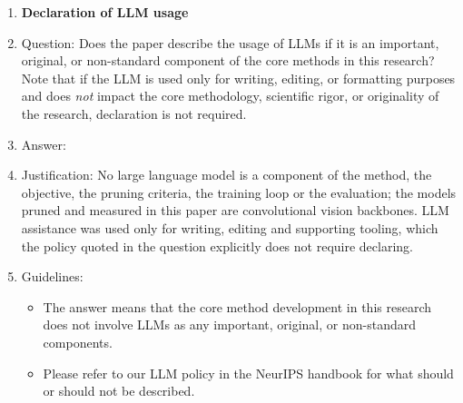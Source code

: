 \begin{enumerate}
\item {\bf Declaration of LLM usage}
    \item[] Question: Does the paper describe the usage of LLMs if it is an important, original, or non-standard component of the core methods in this research? Note that if the LLM is used only for writing, editing, or formatting purposes and does \emph{not} impact the core methodology, scientific rigor, or originality of the research, declaration is not required.
    \item[] Answer: \answerNA{}
    \item[] Justification: No large language model is a component of the method, the objective, the pruning criteria, the training loop or the evaluation; the models pruned and measured in this paper are convolutional vision backbones. LLM assistance was used only for writing, editing and supporting tooling, which the policy quoted in the question explicitly does not require declaring.
    \item[] Guidelines:
    \begin{itemize}
        \item The answer \answerNA{} means that the core method development in this research does not involve LLMs as any important, original, or non-standard components.
        \item Please refer to our LLM policy in the NeurIPS handbook for what should or should not be described.
    \end{itemize}

\end{enumerate}
